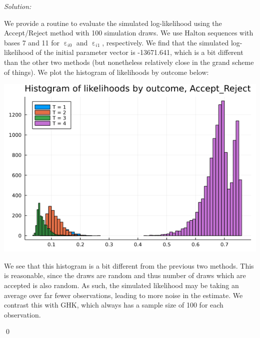 \documentclass[12pt]{article}
\DeclareMathOperator{\eps}{\varepsilon}
\newenvironment{problem}[2][Problem]{\begin{trivlist}
\item[\hskip \labelsep {\bfseries #1}\hskip \labelsep {\bfseries #2.}]}{\end{trivlist}}
\newenvironment{sol}
    {\emph{Solution:}
    }
    {
    \qed
    }
\begin{document}
\begin{sol}
    We provide a routine to evaluate the simulated log-likelihood using the Accept/Reject method with 100 simulation draws. We use Halton sequences with bases 7 and 11 for $\eps_{i0}$ and $\eps_{i1}$, respectively. We find that the simulated log-likelihood of the initial parameter vector is -13671.641, which is a bit different than the other two methods (but nonetheless relatively close in the grand scheme of things). We plot the histogram of likelihoods by outcome below:
    \begin{center}
        \includegraphics[scale=0.5]{Accept_Reject_ll.png}
    \end{center}
    We see that this histogram is a bit different from the previous two methods. This is reasonable, since the draws are random and thus number of draws which are accepted is also random. As such, the simulated likelihood may be taking an average over far fewer observations, leading to more noise in the estimate. We contrast this with GHK, which always has a sample size of 100 for each observation.
\end{sol}
\begin{problem}{4}
\end{problem}
\end{document}
